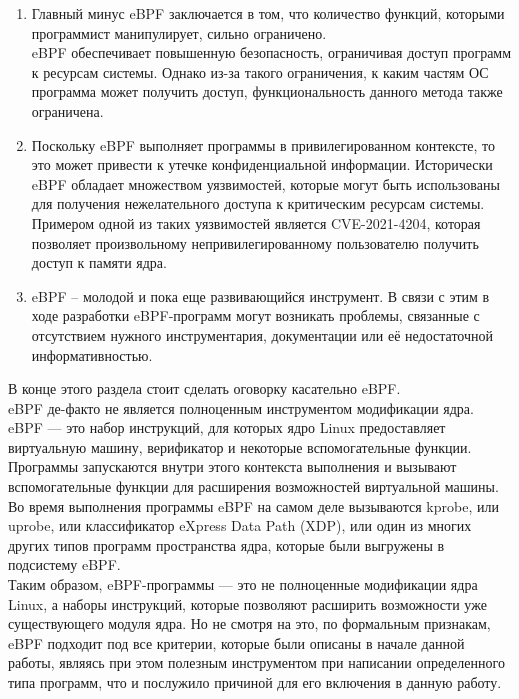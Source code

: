 \begin{enumerate}
    \item Главный минус eBPF заключается в том, что количество функций, которыми программист манипулирует, сильно ограничено.\\
    eBPF обеспечивает повышенную безопасность, ограничивая доступ программ к ресурсам системы.
    Однако из-за такого ограничения, к каким частям ОС программа может получить доступ, функциональность данного метода также ограничена.
    \item Поскольку eBPF выполняет программы в привилегированном контексте, то это может привести к утечке конфиденциальной информации.
    Исторически eBPF обладает множеством уязвимостей, которые могут быть использованы для получения нежелательного доступа к критическим ресурсам системы.
    Примером одной из таких уязвимостей является CVE-2021-4204\cite{cve-2021-4204}, которая позволяет произвольному непривилегированному пользователю получить доступ к памяти ядра.
    \item eBPF -- молодой и пока еще развивающийся инструмент.
    В связи с этим в ходе разработки eBPF-программ могут возникать проблемы, связанные с отсутствием нужного инструментария, документации или её недостаточной информативностью.
\end{enumerate}
\newpage
\noindent В конце этого раздела стоит сделать оговорку касательно eBPF\@.
\vspace{5mm}\\
eBPF де-факто не является полноценным инструментом модификации ядра.\\
eBPF — это набор инструкций, для которых ядро Linux предоставляет виртуальную машину, верификатор и некоторые вспомогательные функции.
Программы запускаются внутри этого контекста выполнения и вызывают вспомогательные функции для расширения возможностей виртуальной машины.
Во время выполнения программы eBPF на самом деле вызываются kprobe, или uprobe, или классификатор eXpress Data Path (XDP),
или один из многих других типов программ пространства ядра, которые были выгружены в подсистему eBPF\@.
\\
Таким образом, eBPF-программы — это не полноценные модификации ядра Linux, а наборы инструкций, которые позволяют расширить возможности уже существующего модуля ядра\@.
Но не смотря на это, по формальным признакам, eBPF подходит под все критерии, которые были описаны в начале данной работы,
являясь при этом полезным инструментом при написании определенного типа программ, что и послужило причиной для его включения в данную работу.
\newpage

